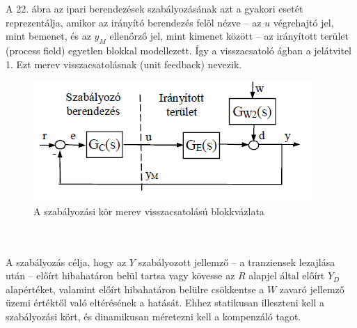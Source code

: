 \documentclass[11pt,a4paper]{article}
\begin{document}
A 22. ábra az ipari berendezések szabályozásának azt a gyakori esetét reprezentálja,
amikor az irányító berendezés felöl nézve – az $u$ végrehajtó jel, mint bemenet,
és az $y_M$ ellenőrző jel, mint kimenet között – az irányított terület (process field) egyetlen
blokkal modellezett. Így a visszacsatoló ágban a jelátvitel 1. Ezt merev visszacsatolásnak
(unit feedback) nevezik.
\begin{figure}[hbtp]
    	 \centering
		\includegraphics[scale=1.0]{22_szabalyozas_blokk_merev_vcs.png}
		\caption{A szabályozási kör merev visszacsatolású blokkvázlata}
\end{figure}
\\\\
A szabályozás célja, hogy az $Y$ szabályozott jellemző – a tranziensek lezajlása
után – előírt hibahatáron belül tartsa vagy kövesse az $R$ alapjel által előírt $Y_D$ alapértéket,
valamint előírt hibahatáron belülre csökkentse a $W$ zavaró jellemző üzemi értéktől
való eltérésének a hatását. Ehhez statikusan illeszteni kell a szabályozási kört, és dinamikusan
méretezni kell a kompenzáló tagot.
\end{document}
